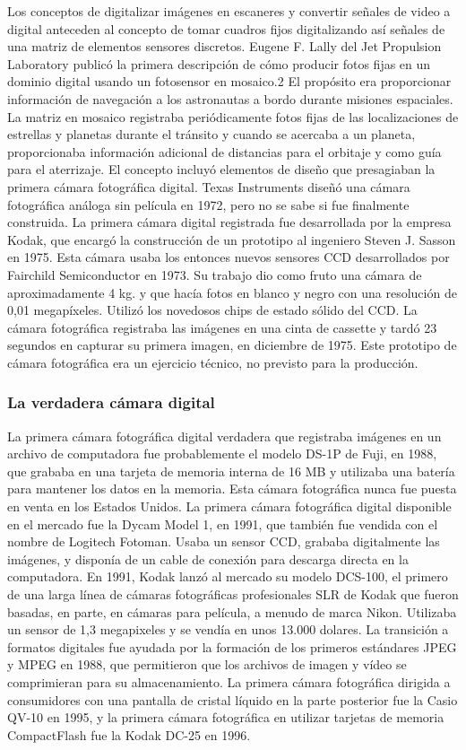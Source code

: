 \documentclass[12pt,a4paper]{report}
\begin{document}
Los conceptos de digitalizar imágenes en escaneres y convertir señales de video
a digital anteceden al concepto de tomar cuadros fijos digitalizando así señales
de una matriz de elementos sensores discretos. Eugene F. Lally del Jet
Propulsion Laboratory publicó la primera descripción de cómo producir fotos
fijas en un dominio digital usando un fotosensor en mosaico.2 El propósito era
proporcionar información de navegación a los astronautas a bordo durante
misiones espaciales. La matriz en mosaico registraba periódicamente fotos fijas
de las localizaciones de estrellas y planetas durante el tránsito y cuando se
acercaba a un planeta, proporcionaba información adicional de distancias para el
orbitaje y como guía para el aterrizaje. El concepto incluyó elementos de diseño
que presagiaban la primera cámara fotográfica digital.
Texas Instruments diseñó una cámara fotográfica análoga sin película en 1972,
pero no se sabe si fue finalmente construida. La primera cámara digital
registrada fue desarrollada por la empresa Kodak, que encargó la construcción de
un prototipo al ingeniero Steven J. Sasson en 1975. Esta cámara usaba los
entonces nuevos sensores CCD desarrollados por Fairchild Semiconductor en 1973.
Su trabajo dio como fruto una cámara de aproximadamente 4 kg. y que hacía fotos
en blanco y negro con una resolución de 0,01 megapíxeles. Utilizó los novedosos
chips de estado sólido del CCD. La cámara fotográfica registraba las imágenes en
una cinta de cassette y tardó 23 segundos en capturar su primera imagen, en
diciembre de 1975. Este prototipo de cámara fotográfica era un ejercicio
técnico, no previsto para la producción.
\subsubsection{La verdadera cámara digital }
La primera cámara fotográfica digital verdadera que registraba imágenes en un
archivo de computadora fue probablemente el modelo DS-1P de Fuji, en 1988, que
grababa en una tarjeta de memoria interna de 16 MB y utilizaba una batería para
mantener los datos en la memoria. Esta cámara fotográfica nunca fue puesta en
venta en los Estados Unidos. La primera cámara fotográfica digital disponible en
el mercado fue la Dycam Model 1, en 1991, que también fue vendida con el nombre
de Logitech Fotoman. Usaba un sensor CCD, grababa digitalmente las imágenes, y
disponía de un cable de conexión para descarga directa en la computadora.
En 1991, Kodak lanzó al mercado su modelo DCS-100, el primero de una larga línea
de cámaras fotográficas profesionales SLR de Kodak que fueron basadas, en parte,
en cámaras para película, a menudo de marca Nikon. Utilizaba un sensor de 1,3
megapixeles y se vendía en unos 13.000 dolares.
La transición a formatos digitales fue ayudada por la formación de los primeros
estándares JPEG y MPEG en 1988, que permitieron que los archivos de imagen y
vídeo se comprimieran para su almacenamiento. La primera cámara fotográfica
dirigida a consumidores con una pantalla de cristal líquido en la parte
posterior fue la Casio QV-10 en 1995, y la primera cámara fotográfica en
utilizar tarjetas de memoria CompactFlash fue la Kodak DC-25 en 1996.
\end{document}
